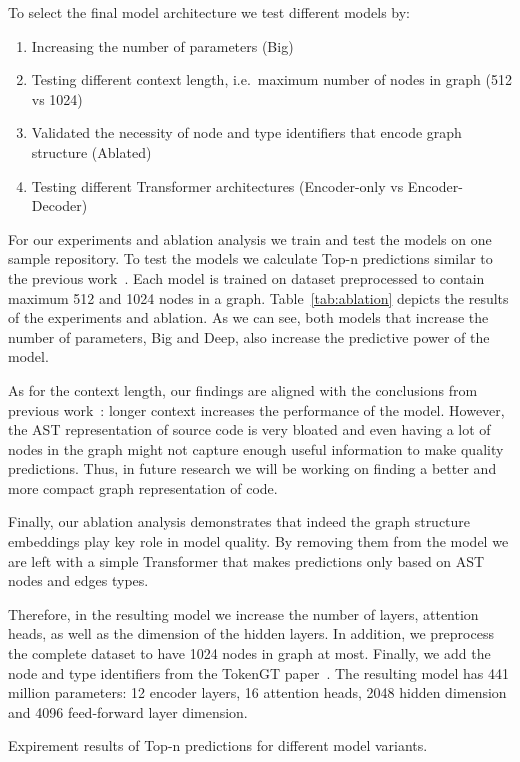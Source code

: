 To select the final model architecture we test different models by:

\begin{enumerate}
    \item Increasing the number of parameters (Big)
    \item Testing different context length, i.e.\ maximum number of nodes in graph (512 vs 1024)
    \item Validated the necessity of node and type identifiers that encode graph structure (Ablated)
    \item Testing different Transformer architectures (Encoder-only vs Encoder-Decoder)
\end{enumerate}

For our experiments and ablation analysis we train and test the models on one sample repository.
To test the models we calculate Top-n predictions similar to the previous work~\cite{mir_type4py_2021}.
Each model is trained on dataset preprocessed to contain maximum 512 and 1024 nodes in a graph.
Table~\ref{tab:ablation} depicts the results of the experiments and ablation.
As we can see, both models that increase the number of parameters, Big and Deep, also increase the predictive power of the model.

As for the context length, our findings are aligned with the conclusions from previous work~\cite{arutyunov_big_2022}:
longer context increases the performance of the model.
However, the AST representation of source code is very bloated and even having a lot of nodes in the graph might not capture
enough useful information to make quality predictions.
Thus, in future research we will be working on finding a better and more compact graph representation of code.

Finally, our ablation analysis demonstrates that indeed the graph structure embeddings play key role in model quality.
By removing them from the model we are left with a simple Transformer that makes predictions only based on AST nodes and edges types.

Therefore, in the resulting model we increase the number of layers, attention heads, as well as the dimension of the hidden layers.
In addition, we preprocess the complete dataset to have 1024 nodes in graph at most.
Finally, we add the node and type identifiers from the TokenGT paper~\cite{kim_pure_2022}.
The resulting model has 441 million parameters: 12 encoder layers, 16 attention heads, 2048 hidden dimension and 4096 feed-forward layer dimension.

\begin{table}
    \centering
    \caption{Expirement results of Top-n predictions for different model variants.}
    \label{tab:ablation}
    
\end{table}